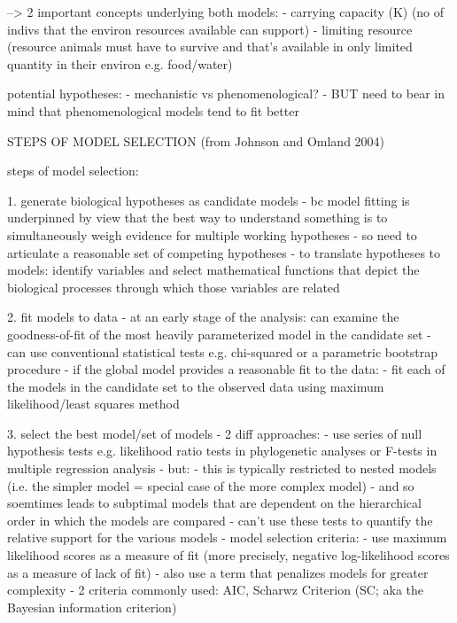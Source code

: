 \documentclass[11pt]{article}
\begin{document}
	
	
	--> 2 important concepts underlying both models:
	- carrying capacity (K) (no of indivs that the environ resources available can support)
	- limiting resource (resource animals must have to survive and that's available in only limited quantity in their environ e.g. food/water)
	
	
	
	
	
	
	
	potential hypotheses:
	- mechanistic vs phenomenological?
	- BUT need to bear in mind that phenomenological models tend to fit better
	
	
	
	
	
	STEPS OF MODEL SELECTION (from Johnson and Omland 2004)
	
	steps of model selection:
	
	1. generate biological hypotheses as candidate models
	- bc model fitting is underpinned by view that the best way to understand something is to simultaneously weigh evidence for multiple working hypotheses
	- so need to articulate a reasonable set of competing hypotheses
	- to translate hypotheses to models: identify variables and select mathematical functions that depict the biological processes through which those variables are related
	
	2. fit models to data
	- at an early stage of the analysis: can examine the goodness-of-fit of the most heavily parameterized model in the candidate set
	- can use conventional statistical tests e.g. chi-squared or a parametric bootstrap procedure
	- if the global model provides a reasonable fit to the data:
	- fit each of the models in the candidate set to the observed data using maximum likelihood/least squares method
	
	
	3. select the best model/set of models
	- 2 diff approaches:
	- use series of null hypothesis tests e.g. likelihood ratio tests in phylogenetic analyses or F-tests in multiple regression analysis
	- but: 
	- this is typically restricted to nested models (i.e. the simpler model = special case of the more complex model)
	- and so soemtimes leads to subptimal models that are dependent on the hierarchical order in which the models are compared
	- can't use these tests to quantify the relative support for the various models
	- model selection criteria:
	- use maximum likelihood scores as a measure of fit (more precisely, negative log-likelihood scores as a measure of lack of fit)
	- also use a term that penalizes models for greater complexity
	- 2 criteria commonly used: AIC, Scharwz Criterion (SC; aka the Bayesian information criterion)
	
\end{document}
